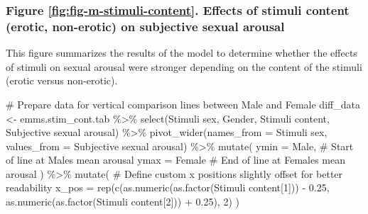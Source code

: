 \documentclass[
  bookmarksnumbered]{article}
\newenvironment{Shaded}{\begin{snugshade}}{\end{snugshade}}
\newcommand{\AttributeTok}[1]{\textcolor[rgb]{0.80,0.80,0.80}{#1}}
\newcommand{\CommentTok}[1]{\textcolor[rgb]{0.50,0.62,0.50}{#1}}
\newcommand{\DecValTok}[1]{\textcolor[rgb]{0.86,0.86,0.80}{#1}}
\newcommand{\FloatTok}[1]{\textcolor[rgb]{0.75,0.75,0.82}{#1}}
\newcommand{\FunctionTok}[1]{\textcolor[rgb]{0.94,0.94,0.56}{#1}}
\newcommand{\NormalTok}[1]{\textcolor[rgb]{0.80,0.80,0.80}{#1}}
\newcommand{\OtherTok}[1]{\textcolor[rgb]{0.94,0.94,0.56}{#1}}
\newcommand{\SpecialCharTok}[1]{\textcolor[rgb]{0.86,0.64,0.64}{#1}}
\newcommand{\StringTok}[1]{\textcolor[rgb]{0.80,0.58,0.58}{#1}}
\begin{document}
\subsubsection{Figure \ref{fig:fig-m-stimuli-content}. Effects of stimuli content (erotic, non-erotic) on subjective sexual arousal}\label{figure-reffigfig-m-stimuli-content.-effects-of-stimuli-content-erotic-non-erotic-on-subjective-sexual-arousal}

This figure summarizes the results of the model to determine whether the effects of stimuli on sexual arousal were stronger depending on the content of the stimuli (erotic versus non-erotic).

\begin{Shaded}
\begin{Highlighting}[]
\CommentTok{\# Prepare data for vertical comparison lines between Male and Female}
\NormalTok{diff\_data }\OtherTok{\textless{}{-}}\NormalTok{ emms.stim\_cont.tab }\SpecialCharTok{\%\textgreater{}\%}
  \FunctionTok{select}\NormalTok{(}\StringTok{\textasciigrave{}}\AttributeTok{Stimuli sex}\StringTok{\textasciigrave{}}\NormalTok{, Gender, }\StringTok{\textasciigrave{}}\AttributeTok{Stimuli content}\StringTok{\textasciigrave{}}\NormalTok{, }\StringTok{\textasciigrave{}}\AttributeTok{Subjective sexual arousal}\StringTok{\textasciigrave{}}\NormalTok{) }\SpecialCharTok{\%\textgreater{}\%}
  \FunctionTok{pivot\_wider}\NormalTok{(}\AttributeTok{names\_from =} \StringTok{\textasciigrave{}}\AttributeTok{Stimuli sex}\StringTok{\textasciigrave{}}\NormalTok{, }\AttributeTok{values\_from =} \StringTok{\textasciigrave{}}\AttributeTok{Subjective sexual arousal}\StringTok{\textasciigrave{}}\NormalTok{) }\SpecialCharTok{\%\textgreater{}\%}
  \FunctionTok{mutate}\NormalTok{(}
    \AttributeTok{ymin =}\NormalTok{ Male,  }\CommentTok{\# Start of line at Male\textquotesingle{}s mean arousal}
    \AttributeTok{ymax =}\NormalTok{ Female  }\CommentTok{\# End of line at Female\textquotesingle{}s mean arousal}
\NormalTok{  ) }\SpecialCharTok{\%\textgreater{}\%}
  \FunctionTok{mutate}\NormalTok{(}
    \CommentTok{\# Define custom x positions slightly offset for better readability}
    \AttributeTok{x\_pos =} \FunctionTok{rep}\NormalTok{(}\FunctionTok{c}\NormalTok{(}\FunctionTok{as.numeric}\NormalTok{(}\FunctionTok{as.factor}\NormalTok{(}\StringTok{\textasciigrave{}}\AttributeTok{Stimuli content}\StringTok{\textasciigrave{}}\NormalTok{[}\DecValTok{1}\NormalTok{])) }\SpecialCharTok{{-}} \FloatTok{0.25}\NormalTok{, }
                  \FunctionTok{as.numeric}\NormalTok{(}\FunctionTok{as.factor}\NormalTok{(}\StringTok{\textasciigrave{}}\AttributeTok{Stimuli content}\StringTok{\textasciigrave{}}\NormalTok{[}\DecValTok{2}\NormalTok{])) }\SpecialCharTok{+} \FloatTok{0.25}\NormalTok{), }\DecValTok{2}\NormalTok{)}
\NormalTok{  )}


\end{Highlighting}
\end{Shaded}
\end{document}
